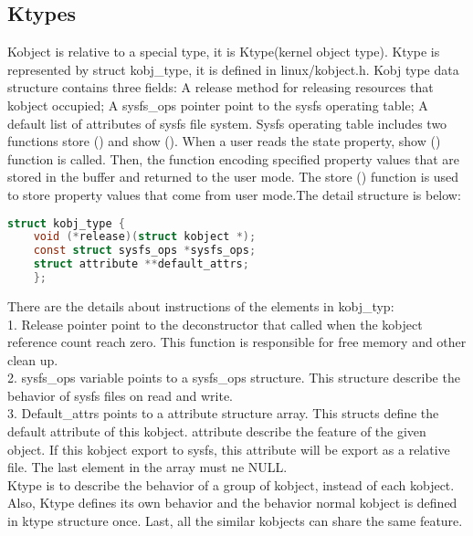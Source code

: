\documentclass[10pt,draftclsnofoot,peerreview ,letterpaper,onecolumn,]{IEEEtran}
\begin{document}
	\subsection{Ktypes}
	Kobject is relative to a special type, it is Ktype(kernel object type). Ktype is represented by struct kobj\_type, it is defined in linux/kobject.h. Kobj type data structure contains three fields: A release method for releasing resources that kobject occupied; A sysfs\_ops pointer point to the sysfs operating table; A default list of attributes of sysfs file system. Sysfs operating table includes two functions store () and show (). When a user reads the state property, show () function is called. Then, the function encoding specified property values that are stored in the buffer and returned to the user mode. The store () function is used to store property values that come from user mode.The detail structure is below: 
	\begin{lstlisting}[language=C]
	struct kobj_type {
	void (*release)(struct kobject *);
	const struct sysfs_ops *sysfs_ops;
	struct attribute **default_attrs;
	};
	\end{lstlisting}    
    There are the details about instructions of the elements in kobj\_typ: \\
		1. Release pointer point to the deconstructor that called when the kobject reference count reach zero. This function is responsible for free memory and other clean up.\\
		2. sysfs\_ops variable points to a sysfs\_ops structure. This structure describe the behavior of sysfs files on read and write. \\
		3. Default\_attrs points to a attribute structure array. This structs define the default attribute of this kobject. attribute describe the feature of the given object. If this kobject export to sysfs, this attribute will be export as a relative file. The last element in the array must ne NULL.\\
		
	Ktype is to describe the behavior of a group of kobject, instead of each kobject. Also, Ktype defines its own behavior and the behavior normal kobject is defined in ktype structure once. Last, all the similar kobjects can share the same feature.
	
\end{document}
